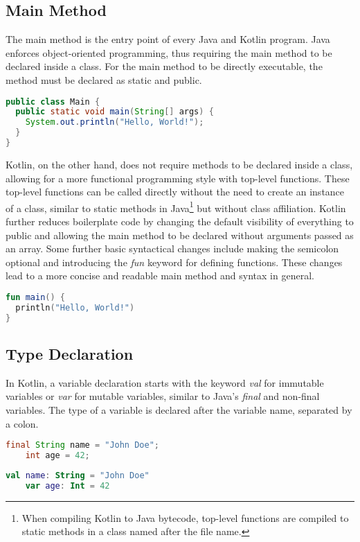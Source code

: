 \documentclass[a4paper, 11pt]{article}
\begin{document}
\subsection{Main Method}
  The main method is the entry point of every Java and Kotlin program.
  Java enforces object-oriented programming, thus requiring the main method to be declared inside a class.
  For the main method to be directly executable, the method must be declared as static and public.
  \begin{lstlisting}[language=Java,title={Java main method}]
public class Main {
  public static void main(String[] args) {
    System.out.println("Hello, World!");
  }
}
\end{lstlisting}
  Kotlin, on the other hand, does not require methods to be declared inside a class, allowing for a more functional programming style with top-level functions.
  These top-level functions can be called directly without the need to create an instance of a class, similar to static methods in Java\footnote{When compiling Kotlin to Java bytecode, top-level functions are compiled to static methods in a class named after the file name.} but without class affiliation.
  Kotlin further reduces boilerplate code by changing the default visibility of everything to public and allowing the main method to be declared without arguments passed as an array.
  Some further basic syntactical changes include making the semicolon optional and introducing the \textit{fun} keyword for defining functions.
  These changes lead to a more concise and readable main method and syntax in general.
\begin{lstlisting}[language=Kotlin,title={Kotlin main method}]
fun main() {
  println("Hello, World!")
}
\end{lstlisting}

\subsection{Type Declaration}
  In Kotlin, a variable declaration starts with the keyword \textit{val} for immutable variables or \textit{var} for mutable variables, similar to Java's \textit{final} and non-final variables.
  The type of a variable is declared after the variable name, separated by a colon.
\begin{lstlisting}[language=Java,title={Java data types}]
    final String name = "John Doe";
    int age = 42;
  \end{lstlisting}
  \begin{lstlisting}[language=Kotlin,title={Kotlin data types}]
    val name: String = "John Doe"
    var age: Int = 42
  \end{lstlisting}
\end{document}
